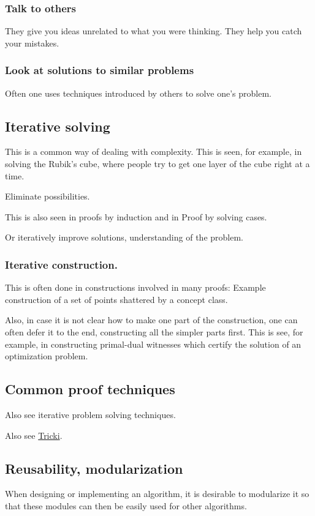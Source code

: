 \documentclass[oneside, article]{memoir}
\begin{document}
\subsubsection{Talk to others}
They give you ideas unrelated to what you were thinking. They help you catch your mistakes.

\subsubsection{Look at solutions to similar problems}
Often one uses techniques introduced by others to solve one's problem.

\subsection{Iterative solving}
This is a common way of dealing with complexity. This is seen, for example, in solving the Rubik's cube, where people try to get one layer of the cube right at a time.

Eliminate possibilities.

This is also seen in proofs by induction and in Proof by solving cases.

Or iteratively improve solutions, understanding of the problem. 

\subsubsection{Iterative construction.}
This is often done in constructions involved in many proofs: Example construction of a set of points shattered by a concept class.

Also, in case it is not clear how to make one part of the construction, one can often defer it to the end, constructing all the simpler parts first. This is see, for example, in constructing primal-dual witnesses which certify the solution of an optimization problem.

\subsection{Common proof techniques}
Also see iterative problem solving techniques.

Also see \href{http://www.tricki.org/article/General_problem-solving_tips}{Tricki}.

\subsection{Reusability, modularization}
When designing or implementing an algorithm, it is desirable to modularize it so that these modules can then be easily used for other algorithms.
\end{document}
